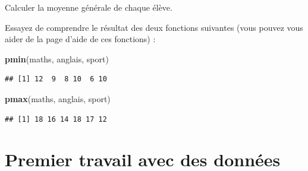 \documentclass[12pt,]{book}
\newenvironment{Shaded}{\begin{snugshade}}{\end{snugshade}}
\newcommand{\DecValTok}[1]{\textcolor[rgb]{0.06,0.06,0.06}{#1}}
\newcommand{\KeywordTok}[1]{\textcolor[rgb]{0.27,0.27,0.27}{\textbf{#1}}}
\newcommand{\NormalTok}[1]{#1}
\newcommand{\OperatorTok}[1]{\textcolor[rgb]{0.43,0.43,0.43}{\textbf{#1}}}
\newcommand{\StringTok}[1]{\textcolor[rgb]{0.5,0.5,0.5}{#1}}
\begin{document}
Calculer la moyenne générale de chaque élève.

Essayez de comprendre le résultat des deux fonctions suivantes (vous pouvez vous aider de la page d'aide de ces fonctions) :

\begin{Shaded}
\begin{Highlighting}[]
\KeywordTok{pmin}\NormalTok{(maths, anglais, sport)}
\end{Highlighting}
\end{Shaded}

\begin{verbatim}
## [1] 12  9  8 10  6 10
\end{verbatim}

\begin{Shaded}
\begin{Highlighting}[]
\KeywordTok{pmax}\NormalTok{(maths, anglais, sport)}
\end{Highlighting}
\end{Shaded}

\begin{verbatim}
## [1] 18 16 14 18 17 12
\end{verbatim}

\hypertarget{premier-travail-avec-des-donnuxe9es}{%
\section{Premier travail avec des données}\label{premier-travail-avec-des-donnuxe9es}}
\end{document}
